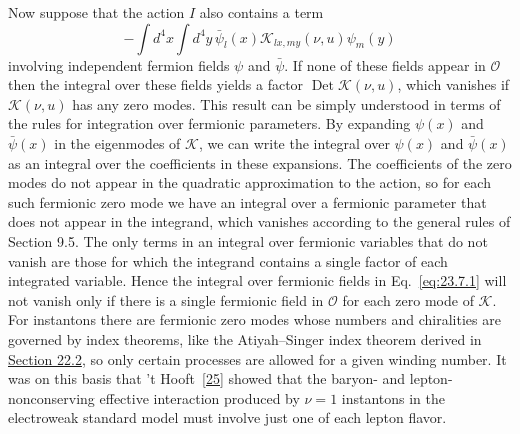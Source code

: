 Now suppose that the action $I$ also contains a term
\[
-\int d^4x\int d^4y\,
\bar\psi_l(x)\mathcal K_{lx,my}(\nu,u)\psi_m(y)
\]
involving independent fermion fields $\psi$ and $\bar\psi$. If none of
these fields appear in $\mathcal O$ then the integral over these fields
yields a factor $\operatorname{Det}\mathcal K(\nu,u)$, which vanishes if
$\mathcal K(\nu,u)$ has any zero modes. This result can be simply
understood in terms of the rules for integration over fermionic
parameters. By expanding $\psi(x)$ and $\bar\psi(x)$ in the eigenmodes
of $\mathcal K$, we can write the integral over $\psi(x)$ and
$\bar\psi(x)$ as an integral over the coefficients in these expansions.
The coefficients of the zero modes do not appear in the quadratic
approximation to the action, so for each such fermionic zero mode we have
an integral over a fermionic parameter that does not appear in the
integrand, which vanishes according to the general rules of Section 9.5.
The only terms in an integral over fermionic variables that do not vanish
are those for which the integrand contains a single factor of each
integrated variable. Hence the integral over fermionic fields in
Eq.~\eqref{eq:23.7.1} will not vanish only if there is a single fermionic
field in $\mathcal O$ for each zero mode of $\mathcal K$. For instantons
there are fermionic zero modes whose numbers and chiralities are governed
by index theorems, like the Atiyah--Singer index theorem derived in
\hyperref[sec:22.2]{Section 22.2}, so only certain processes are allowed
for a given winding number. It was on this basis that
't Hooft~\hyperref[ch23-ref-25]{[25]} showed that the baryon- and
lepton-nonconserving effective interaction produced by $\nu=1$
instantons in the electroweak standard model must involve just one of
each lepton flavor.
